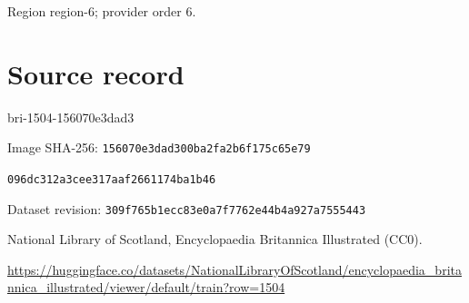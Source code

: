 \documentclass[11pt]{article}
\begin{document}
{\scriptsize\color{gray} Region region-6; provider order 6.\par}
\medskip
\newpage\section*{Source record}
bri-1504-156070e3dad3\par
Image SHA-256: \texttt{156070e3dad300ba2fa2b6f175c65e79}\par\texttt{096dc312a3cee317aaf2661174ba1b46}\par
Dataset revision: \texttt{309f765b1ecc83e0a7f7}\texttt{762e44b4a927a7555443}\par
National Library of Scotland, Encyclopaedia Britannica Illustrated (CC0).\par
\url{https://huggingface.co/datasets/NationalLibraryOfScotland/encyclopaedia_britannica_illustrated/viewer/default/train?row=1504}
\end{document}
